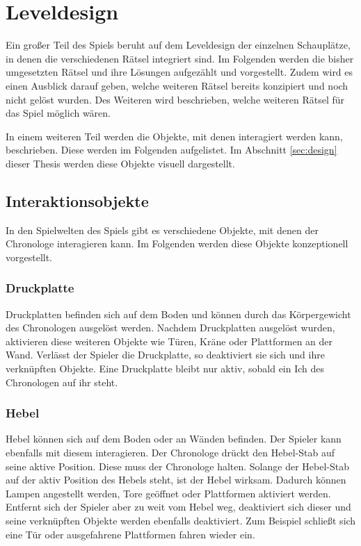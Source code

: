 \section{Leveldesign}
Ein großer Teil des Spiels beruht auf dem Leveldesign der einzelnen Schauplätze, in denen die verschiedenen Rätsel integriert sind. Im Folgenden werden die bisher umgesetzten Rätsel und ihre Lösungen aufgezählt und vorgestellt. Zudem wird es einen Ausblick darauf geben, welche weiteren Rätsel bereits konzipiert und noch nicht gelöst wurden. Des Weiteren wird beschrieben, welche weiteren Rätsel für das Spiel möglich wären.

In einem weiteren Teil werden die Objekte, mit denen interagiert werden kann, beschrieben. Diese werden im Folgenden aufgelistet. Im Abschnitt \ref{sec:design} dieser Thesis werden diese Objekte visuell dargestellt.

\subsection{Interaktionsobjekte}
In den Spielwelten des Spiels gibt es verschiedene Objekte, mit denen der Chronologe interagieren kann. Im Folgenden werden diese Objekte konzeptionell vorgestellt.

\subsubsection{Druckplatte}
Druckplatten befinden sich auf dem Boden und können durch das Körpergewicht des Chronologen ausgelöst werden. Nachdem Druckplatten ausgelöst wurden, aktivieren diese weiteren Objekte wie  Türen, Kräne oder Plattformen an der Wand. Verlässt der Spieler die Druckplatte, so deaktiviert sie sich und ihre verknüpften Objekte. Eine Druckplatte bleibt nur aktiv, sobald ein Ich des Chronologen auf ihr steht. 

\subsubsection{Hebel}
Hebel können sich auf dem Boden oder an Wänden befinden. Der Spieler kann ebenfalls mit diesem interagieren. Der Chronologe drückt den Hebel-Stab auf seine aktive Position. Diese muss der Chronologe halten. Solange der Hebel-Stab auf der aktiv Position des Hebels steht, ist der Hebel wirksam. Dadurch können Lampen angestellt werden, Tore geöffnet oder Plattformen aktiviert werden. Entfernt sich der Spieler aber zu weit vom Hebel weg, deaktiviert sich dieser und seine verknüpften Objekte werden ebenfalls deaktiviert. Zum Beispiel schließt sich eine Tür oder ausgefahrene Plattformen fahren wieder ein.

